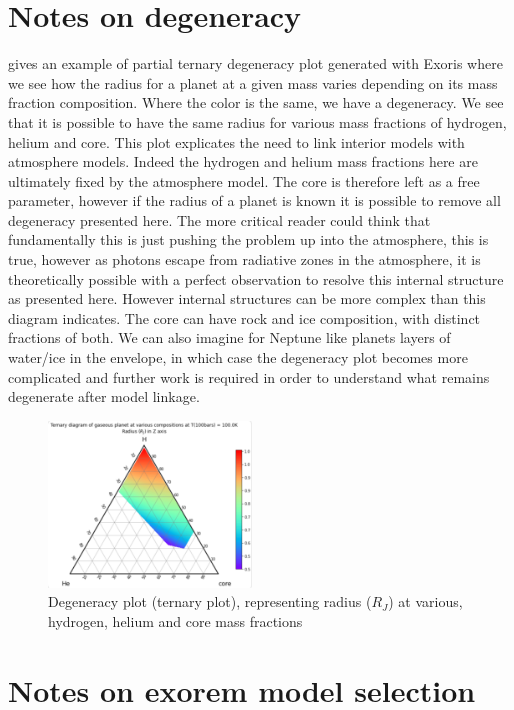 \section{Notes on degeneracy}

 gives an example of partial ternary degeneracy plot generated with Exoris where we see how the radius for a planet at a given mass varies depending on its mass fraction composition. Where the color is the same, we have a degeneracy. We see that it is possible to have the same radius for various mass fractions of hydrogen, helium and core. This plot explicates the need to link interior models with atmosphere models. Indeed the hydrogen and helium mass fractions here are ultimately fixed by the atmosphere model. The core is therefore left as a free parameter, however if the radius of a planet is known it is possible to remove all degeneracy presented here. The more critical reader could think that fundamentally this is just pushing the problem up into the atmosphere, this is true, however as photons escape from radiative zones in the atmosphere, it is theoretically possible with a perfect observation to resolve this internal structure as presented here. However internal structures can be more complex than this diagram indicates. The core can have rock and ice composition, with distinct fractions of both. We can also imagine for Neptune like planets layers of water/ice in the envelope, in which case the degeneracy plot becomes more complicated and further work is required in order to understand what remains degenerate after model linkage.

\begin{figure}
    \centering
    \includegraphics[width=0.48\textwidth]{Images/degeneracies.png}
    \caption{Degeneracy plot (ternary plot), representing radius ($R_J$) at various, hydrogen, helium and core mass fractions}
    \label{fig:Degen}
\end{figure}

\section{Notes on exorem model selection}

